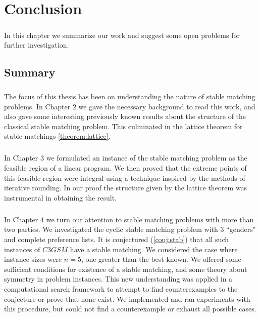 \chapter{Conclusion}

\paragraph{}
In this chapter we summarize our work and suggest some open problems for further investigation.

\section{Summary}

\paragraph{}
The focus of this thesis has been on understanding the nature of stable matching problems. In Chapter $2$ we gave the necessary background to read this work, and also gave some interesting previously known results about the structure of the classical stable matching problem. This culminated in the lattice theorem for stable matchings \ref{theorem:lattice}. 
\paragraph{}
In Chapter $3$ we formulated an instance of the stable matching problem as the feasible region of a linear program. We then proved that the extreme points of this feasible region were integral using a technique inspired by the methods of iterative rounding. In our proof the structure given by the lattice theorem was instrumental in obtaining the result.
\paragraph{}
In Chapter $4$ we turn our attention to stable matching problems with more than two parties. We investigated the cyclic stable matching problem with $3$ ``genders" and complete preference lists. It is conjectured (\ref{conj:stab}) that all such instances of $C3GSM$ have a stable matching. We considered the case where instance sizes were $n=5$, one greater than the best known. We offered some sufficient conditions for existence of a stable matching, and some theory about symmetry in problem instances. This new understanding was applied in a computational search framework to attempt to find counterexamples to the conjecture or prove that none exist. We implemented and ran experiments with this procedure, but could not find a counterexample or exhaust all possible cases. 

